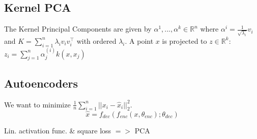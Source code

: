 \subsection*{Kernel PCA}

The Kernel Principal Components are given by $\alpha^{1},...,\alpha^{k}\in \mathbb{R}^n$ 
where $\alpha^{i} = \frac{1}{\sqrt{\lambda_i}}v_i$ and 
$K = \sum_{i=1}^n \lambda_i v_i v_i^\top$ with ordered $\lambda_i.$ A point 
$x$ is projected to $z \in \mathbb{R}^k$:
$z_i = \sum_{j=1}^n\alpha_j^{(i)}k(x,x_j)$

\subsection*{Autoencoders}

We want to minimize $\frac{1}{n}\sum_{i=1}^n ||x_i - \hat{x}_i||_2^2$.
$$\hat{x} = f_{dec}(f_{enc}(x, \theta_{enc}); \theta_{dec})$$

Lin. activation func. \& square loss $=>$ PCA
